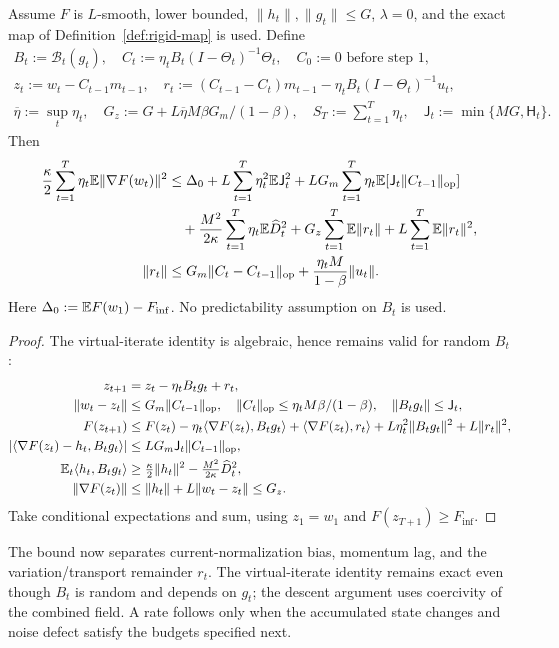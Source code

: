 \begin{theorem}
\label{thm:actual-convergence}
Assume $F$ is $L$-smooth, lower bounded, $\|h_t\|,\|g_t\|\le G$, $\lambda=0$,
and the exact map of Definition~\ref{def:rigid-map} is used. Define
\begin{gather}
 B_t:=\mathcal B_t(g_t),\quad
 C_t:=\eta_tB_t(I-\Theta_t)^{-1}\Theta_t,\quad C_0:=0\text{ before step }1,\\
 z_t:=w_t-C_{t-1}m_{t-1},\quad
 r_t:=(C_{t-1}-C_t)m_{t-1}-\eta_tB_t(I-\Theta_t)^{-1}u_t,\\
 \overline\eta:=\sup_t\eta_t,\quad
 G_z:=G+L\overline\eta M\beta G_m/(1-\beta),\quad
 S_T:=\sum_{t=1}^T\eta_t,\quad\mathsf J_t:=\min\{MG,\mathsf H_t\}.
\end{gather}
Then
\begin{align}
 \frac\kappa2\sum_{t=1}^T\eta_t\mathbb E\|\nabla F(w_t)\|^2
 &\le\Delta_0+L\sum_{t=1}^T\eta_t^2\mathbb E\mathsf J_t^2
       +LG_m\sum_{t=1}^T\eta_t\mathbb E[\mathsf J_t\|C_{t-1}\|_{\mathrm{op}}]\\
 &\quad+\frac{M^2}{2\kappa}\sum_{t=1}^T\eta_t\mathbb E \widehat D_t^2
       +G_z\sum_{t=1}^T\mathbb E\|r_t\|+L\sum_{t=1}^T\mathbb E\|r_t\|^2,
 \label{eq:actual-main-rate}\\
 \|r_t\|&\le G_m\|C_t-C_{t-1}\|_{\mathrm{op}}
                      +\frac{\eta_tM}{1-\beta}\|u_t\|.
\end{align}
Here $\Delta_0:=\mathbb E F(w_1)-F_{\inf}$. No predictability assumption on $B_t$ is used.
\end{theorem}
\begin{proof}
The virtual-iterate identity is algebraic, hence remains valid for random $B_t$:
\begin{align}
 z_{t+1}&=z_t-\eta_tB_tg_t+r_t,\\
 \|w_t-z_t\|&\le G_m\|C_{t-1}\|_{\mathrm{op}},\quad
 \|C_t\|_{\mathrm{op}}\le\eta_t M\beta/(1-\beta),\quad
 \|B_tg_t\|\le\mathsf J_t,\\
 F(z_{t+1})&\le F(z_t)-\eta_t\langle\nabla F(z_t),B_tg_t\rangle
                 +\langle\nabla F(z_t),r_t\rangle
                 +L\eta_t^2\|B_tg_t\|^2+L\|r_t\|^2,\\
 \left|\langle\nabla F(z_t)-h_t,B_tg_t\rangle\right|
 &\le LG_m\mathsf J_t\|C_{t-1}\|_{\mathrm{op}},\\
 \mathbb E_t\langle h_t,B_tg_t\rangle
 &\ge\tfrac\kappa2\|h_t\|^2-\tfrac{M^2}{2\kappa}\widehat D_t^2,\\
 \|\nabla F(z_t)\|&\le\|h_t\|+L\|w_t-z_t\|\le G_z.
\end{align}
Take conditional expectations and sum, using $z_1=w_1$ and $F(z_{T+1})\ge F_{\inf}$.
\end{proof}
The bound now separates current-normalization bias, momentum lag, and the
variation/transport remainder $r_t$. The virtual-iterate identity remains exact
even though $B_t$ is random and depends on $g_t$; the descent argument uses
coercivity of the combined field. A rate follows only when the accumulated
state changes and noise defect satisfy the budgets specified next.


